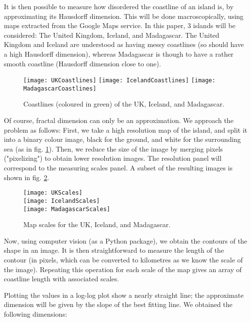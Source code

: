 It is then possible to measure how disordered the coastline of an island is, by approximating its Hausdorff dimension.
This will be done macroscopically, using maps extracted from the Google Maps service.
In this paper, 3 islands will be considered: The United Kingdom, Iceland, and Madagascar.
The United Kingdom and Iceland are understood as having messy coastlines (so should have a high Hausdorff dimension), whereas Madagascar is though to have a rather smooth coastline (Hausdorff dimension close to one).

\begin{figure}[!h]
	\texttt{[image: UKCoastlines]}
	\hspace{1.5cm}
	\texttt{[image: IcelandCoastlines]}
	\hspace{1.5cm}
	\texttt{[image: MadagascarCoastlines]}
	\centering
	\caption{Coastlines (coloured in green) of the UK, Iceland, and Madagascar.}
	\label{fig:islandsCoastlines}
\end{figure}

Of course, fractal dimension can only be an approximation.
We approach the problem as follows:
First, we take a high resolution map of the island, and split it into a binary colour image, black for the ground, and white for the surrounding sea (as in fig. \ref{fig:islandsCoastlines}).
Then, we reduce the size of the image by merging pixels ("pixelizing") to obtain lower resolution images.
The resolution panel will correspond to the measuring scales panel.
A subset of the resulting images is shown in fig. \ref{fig:islandsScales}.

\begin{figure}[!h]
	\texttt{[image: UKScales]}\\
	\texttt{[image: IcelandScales]}\\
	\texttt{[image: MadagascarScales]}
	\centering
	\caption{Map scales for the UK, Iceland, and Madagascar.}
	\label{fig:islandsScales}
\end{figure}

Now, using computer vision (as a Python package), we obtain the contours of the shape in an image.
It is then straightforward to measure the length of the contour (in pixels, which can be converted to kilometres as we know the scale of the image).
Repeating this operation for each scale of the map gives an array of coastline length with associated scales.

Plotting the values in a log-log plot show a nearly straight line; the approximate dimension will be given by the slope of the best fitting line.
We obtained the following dimensions:

